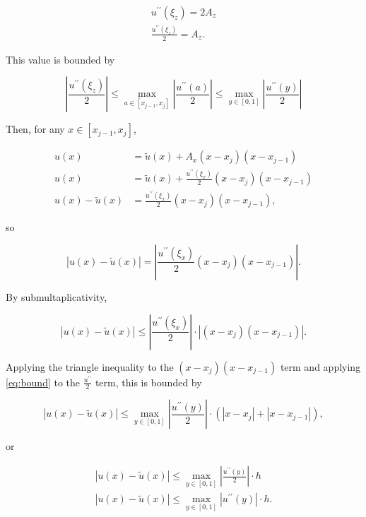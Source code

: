 \documentclass{hw-template}
\begin{document}
\begin{gather}
    u^{\prime\prime}(\xi_z) = 2A_z \\
    \frac{u^{\prime\prime}(\xi_z)}{2} = A_z.
\end{gather}

This value is bounded by

\begin{equation}\label{eq:bound}
    \left|\frac{u^{\prime\prime}(\xi_z)}{2} \right| \leq \max_{a \in [x_{j-1}, x_j]}  \left|\frac{u^{\prime\prime}(a)}{2}\right| \leq \max_{y \in [0, 1]}  \left|\frac{u^{\prime\prime}(y)}{2}\right|
\end{equation}

Then, for any $x \in [x_{j-1}, x_j]$, 

\begin{align}
    u(x) &= \tilde{u}(x) + A_x(x-x_j)(x-x_{j-1})\\
    u(x) &= \tilde{u}(x) + \frac{u^{\prime\prime}(\xi_x)}{2}(x-x_j)(x-x_{j-1})\\
    u(x) - \tilde{u}(x) &= \frac{u^{\prime\prime}(\xi_x)}{2}(x-x_j)(x-x_{j-1}),
\end{align}

so

\begin{equation}
    \left|u(x) - \tilde{u}(x)\right| = \left|\frac{u^{\prime\prime}(\xi_x)}{2}(x-x_j)(x-x_{j-1}) \right|.
\end{equation}

By submultaplicativity, 

\begin{equation}
    \left|u(x) - \tilde{u}(x)\right| \leq \left|\frac{u^{\prime\prime}(\xi_x)}{2}\right| \cdot \left|(x-x_j)(x-x_{j-1}) \right|.
\end{equation}

Applying the triangle inequality to the $(x-x_j)(x-x_{j-1})$ term and applying \autoref{eq:bound} to the $\frac{u^{\prime\prime}}{2}$ term, this is bounded by

\begin{equation}
   \left|u(x) - \tilde{u}(x)\right| \leq  \max_{y \in [0, 1]}  \left|\frac{u^{\prime\prime}(y)}{2}\right| \cdot \left( \left| x-x_j\right| + \left|x-x_{j-1} \right| \right),
\end{equation}

or 

\begin{gather}
    \left|u(x) - \tilde{u}(x)\right| \leq  \max_{y \in [0, 1]}  \left|\frac{u^{\prime\prime}(y)}{2}\right| \cdot h\\
    \left|u(x) - \tilde{u}(x)\right| \leq  \max_{y \in [0, 1]}  \left|{u^{\prime\prime}(y)}\right| \cdot h.
\end{gather}
\end{document}
